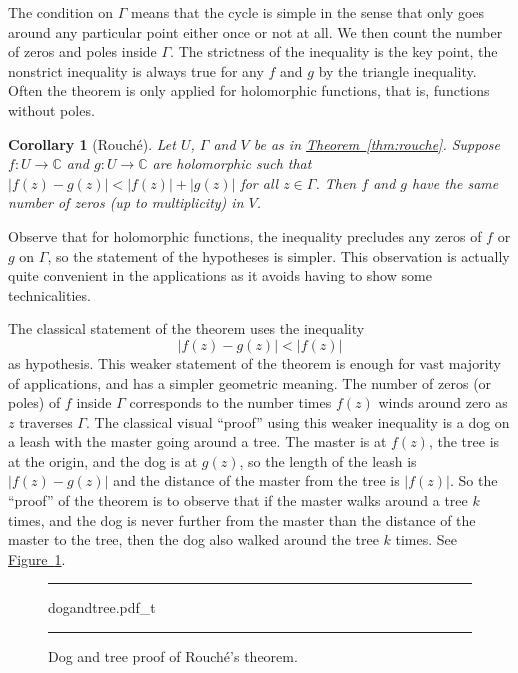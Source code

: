 \documentclass[12pt,openany]{book}
\newcommand{\sabs}[1]{\lvert {#1} \rvert}
\newcommand{\C}{{\mathbb{C}}}
\newcommand{\myquote}[1]{``#1''}
\theoremstyle{plain}
\newtheorem{cor}[thm]{Corollary}
\theoremstyle{remark}
\theoremstyle{definition}
\newenvironment{myfig}{%
\begin{figure}[h!t]
\noindent\rule{\textwidth}{0.5pt}\vspace{12pt}\par\centering}%
{\par\noindent\rule{\textwidth}{0.5pt}
\end{figure}}
\theoremstyle{exercise}
\theoremstyle{example}
\newcommand{\figureref}[1]{\hyperref[#1]{Figure~\ref*{#1}}}
\newcommand{\thmref}[1]{\hyperref[#1]{Theorem~\ref*{#1}}}
\begin{document}
The condition on $\Gamma$ means that the
cycle is simple in the sense
that only goes around any particular point either once or not at all.
We then count the number of zeros and poles inside $\Gamma$.
The strictness of the inequality is the key point,
the nonstrict inequality is always true for any $f$ and $g$ by the triangle
inequality.
Often the theorem is only applied for holomorphic functions, that is,
functions without poles.

\begin{cor}[Rouch\'e]\label{thm:rouche2}
Let $U$, $\Gamma$ and $V$ be as in \thmref{thm:rouche}.
Suppose $f \colon U \to \C$ and $g \colon U \to \C$
are holomorphic such that
$\sabs{f(z)-g(z)} < \sabs{f(z)}+\sabs{g(z)}$
for all $z \in \Gamma$.  Then $f$ and $g$ have the same number of zeros (up
to multiplicity) in $V$.
\end{cor}

Observe that for holomorphic functions,
the inequality precludes any zeros of $f$ or
$g$ on $\Gamma$, so the statement of the hypotheses is simpler.
This observation is actually quite convenient in the
applications as it avoids having to show some technicalities.

The classical statement of the theorem uses the
inequality
\begin{equation*}
\sabs{f(z)-g(z)} < \sabs{f(z)}
\end{equation*}
as hypothesis.
This weaker statement of the theorem is enough for vast majority of
applications, and has a simpler geometric meaning.  The number of zeros (or
poles) of $f$
inside $\Gamma$ corresponds to the number times $f(z)$ winds around zero
as $z$ traverses $\Gamma$.  The classical visual \myquote{proof} using this weaker
inequality is a dog on a leash
with the master going around a tree.  The master is at $f(z)$, the tree is
at the origin, and the dog is at $g(z)$, so the length of the leash is
$\sabs{f(z)-g(z)}$ and the distance of the master from the tree is
$\sabs{f(z)}$.  So the \myquote{proof} of the theorem is to observe that if the
master walks around a tree $k$ times, and the dog is never further from the
master than the distance of the master to the tree, then the dog also walked
around the tree $k$ times.  See \figureref{fig:dogandtree}.

\begin{myfig}
{dogandtree.pdf_t}
\caption{Dog and tree proof of Rouch\'e's theorem.\label{fig:dogandtree}}
\end{myfig}
\end{document}
